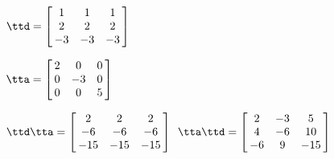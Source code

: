 {$\ttd = \left[\hskip -3pt \begin{array}{ccc} 1&1&1\\  2&2&2
\\  -3&-3&-3\end{array}\hskip -3pt \right] $
 
$\tta = \left[\hskip -3pt \begin{array}{ccc} 2&0&0\\  0&-3&0
\\  0&0&5\end{array}\hskip -3pt \right] $}
{$\ttd\tta= \left[\hskip -3pt \begin{array}{ccc} 2&2&2\\  -6&-6&-6
\\  -15&-15&-15\end{array}\hskip -3pt \right]$\ 
$\tta\ttd =  \left[\hskip -3pt \begin{array}{ccc} 2&-3&5\\  4&-6&10
\\  -6&9&-15\end{array}\hskip -3pt \right] $
}
 

  

  

 


